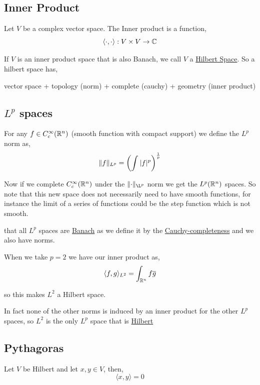 \subsection{Inner Product}
Let $V$ be a complex vector space. The Inner product is a function, 
\[
  \langle \cdot, \cdot \rangle: V \times V \to \mathbb{C}
\]


If $V$ is an inner product space that is also Banach, we call $V$ a \underline{Hilbert Space}. So a hilbert space has, 
\begin{center}
  vector space + topology (norm) + complete (cauchy) + geometry (inner product)
\end{center}

\subsection{$L^{p}$ spaces}

For any $f \in C_c^{\infty}(\mathbb{R}^{n})$ (smooth function with compact support) we define the $L^{p}$ norm as,
\[
  \lVert f\rVert_{L^{p}} = \left ( \int_{}^{} |f|^{p} \right )^{\frac{1}{p}}
\]

Now if we complete $C_c^{\infty}(\mathbb{R}^{n})$ under the $\norm{\cdot}_{\L^{p}}$ norm we get the $L^{p}(\mathbb{R}^{n})$ spaces. So note that this new space does not necessarily need to have smooth functions, for instance the limit of a series of functions could be the step function which is not smooth.

\vspace{1em}

\begin{note}
that all $L^{p}$ spaces are \underline{Banach} as we define it by the \underline{Cauchy-completeness} and we also have norms. 
\end{note}

\vspace{1em}
When we take $p = 2$ we have our inner product as, 
\[
  \langle f, g \rangle_{L^2} = \int_{\mathbb{R}^{n}}^{} f \overline{g}
\]

so this makes $L^2$ a Hilbert space.
\begin{remark}
  In fact none of the other norms is induced by an inner product for the other $L^{p}$ spaces, so $L^2$ is the only $L^{p}$ space that is \underline{Hilbert}
\end{remark}

\subsection{Pythagoras}
Let $V$ be Hilbert and let $x,y \in V$, then, 
\[
  \langle x, y \rangle = 0
\]

